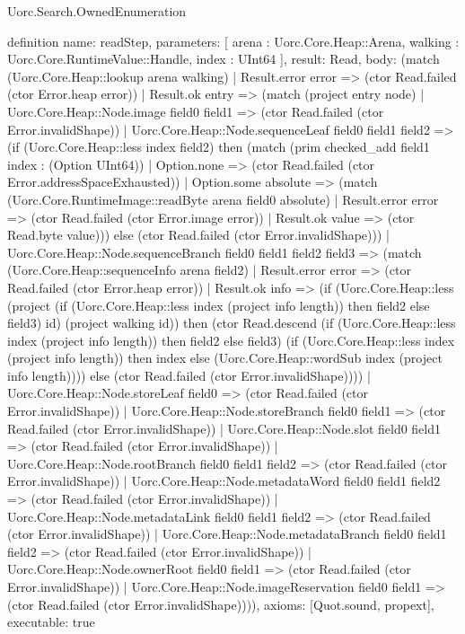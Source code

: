 \begin{lexlean}{Uorc.Search.OwnedEnumeration}
\begin{semanticmodule}
definition{
  name: readStep,
  parameters: [
    arena : Uorc.Core.Heap::Arena,
    walking : Uorc.Core.RuntimeValue::Handle,
    index : UInt64
  ],
  result: Read,
  body: (match (Uorc.Core.Heap::lookup arena walking)
    | Result.error error => (ctor Read.failed (ctor Error.heap error))
    | Result.ok entry => (match (project entry node)
      | Uorc.Core.Heap::Node.image field0 field1 => (ctor Read.failed (ctor Error.invalidShape))
      | Uorc.Core.Heap::Node.sequenceLeaf field0 field1 field2 => (if (Uorc.Core.Heap::less index field2) then (match (prim checked_add field1 index : (Option UInt64))
        | Option.none => (ctor Read.failed (ctor Error.addressSpaceExhausted))
        | Option.some absolute => (match (Uorc.Core.RuntimeImage::readByte arena field0 absolute)
          | Result.error error => (ctor Read.failed (ctor Error.image error))
          | Result.ok value => (ctor Read.byte value))) else (ctor Read.failed (ctor Error.invalidShape)))
      | Uorc.Core.Heap::Node.sequenceBranch field0 field1 field2 field3 => (match (Uorc.Core.Heap::sequenceInfo arena field2)
        | Result.error error => (ctor Read.failed (ctor Error.heap error))
        | Result.ok info => (if (Uorc.Core.Heap::less (project (if (Uorc.Core.Heap::less index (project info length)) then field2 else field3) id) (project walking id)) then (ctor Read.descend (if (Uorc.Core.Heap::less index (project info length)) then field2 else field3) (if (Uorc.Core.Heap::less index (project info length)) then index else (Uorc.Core.Heap::wordSub index (project info length)))) else (ctor Read.failed (ctor Error.invalidShape))))
      | Uorc.Core.Heap::Node.storeLeaf field0 => (ctor Read.failed (ctor Error.invalidShape))
      | Uorc.Core.Heap::Node.storeBranch field0 field1 => (ctor Read.failed (ctor Error.invalidShape))
      | Uorc.Core.Heap::Node.slot field0 field1 => (ctor Read.failed (ctor Error.invalidShape))
      | Uorc.Core.Heap::Node.rootBranch field0 field1 field2 => (ctor Read.failed (ctor Error.invalidShape))
      | Uorc.Core.Heap::Node.metadataWord field0 field1 field2 => (ctor Read.failed (ctor Error.invalidShape))
      | Uorc.Core.Heap::Node.metadataLink field0 field1 field2 => (ctor Read.failed (ctor Error.invalidShape))
      | Uorc.Core.Heap::Node.metadataBranch field0 field1 field2 => (ctor Read.failed (ctor Error.invalidShape))
      | Uorc.Core.Heap::Node.ownerRoot field0 field1 => (ctor Read.failed (ctor Error.invalidShape))
      | Uorc.Core.Heap::Node.imageReservation field0 field1 => (ctor Read.failed (ctor Error.invalidShape)))),
  axioms: [Quot.sound, propext],
  executable: true
}


\end{semanticmodule}
\end{lexlean}
